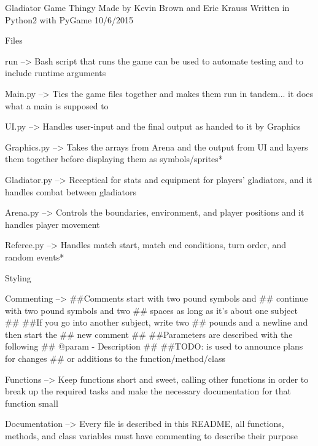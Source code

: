 Gladiator Game Thingy Made by Kevin Brown and Eric Krauss Written in Python2 with Py\+Game 10/6/2015

Files \begin{DoxyVerb}run -->
    Bash script that runs the game
    can be used to automate testing
    and to include runtime arguments

Main.py -->
    Ties the game files together and
    makes them run in tandem...
    it does what a main is supposed to

UI.py -->
    Handles user-input and the final
    output as handed to it by Graphics

Graphics.py -->
    Takes the arrays from Arena and the
    output from UI and layers them
    together before displaying them as
    symbols/sprites*

Gladiator.py -->
    Receptical for stats and equipment
    for players' gladiators, and it
    handles combat between gladiators

Arena.py -->
    Controls the boundaries, environment,
    and player positions and it handles
    player movement

Referee.py -->
    Handles match start, match end
    conditions, turn order, and
    random events*
\end{DoxyVerb}


Styling \begin{DoxyVerb}Commenting -->  
    ##Comments start with two pound symbols and
    ##  continue with two pound symbols and two
    ##  spaces as long as it's about one subject
    ##
    ##If you go into another subject, write two 
    ##  pounds and a newline and then start the
    ##  new comment
    ##
    ##Parameters are described with the following
    ##  @param - Description
    ##
    ##TODO:  is used to announce plans for changes
    ##  or additions to the function/method/class

Functions -->
    Keep functions short and sweet, calling other
    functions in order to break up the required
    tasks and make the necessary documentation for
    that function small

Documentation -->
    Every file is described in this README, all
    functions, methods, and class variables must
    have commenting to describe their purpose\end{DoxyVerb}
 